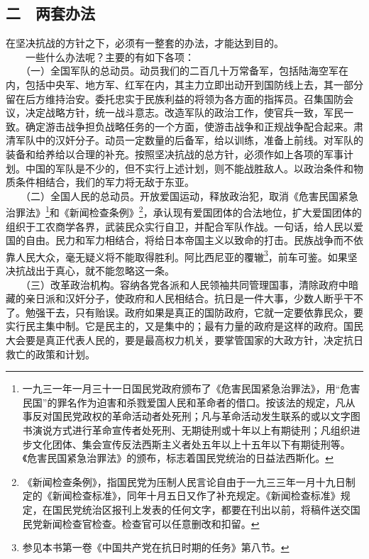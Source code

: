 \documentclass[cn,11pt,chinese]{elegantbook}
\def\myformat#1{\hfil\hfil #1}
\begin{document}
\subsection*{\myformat{二　两套办法}}
在坚决抗战的方针之下，必须有一整套的办法，才能达到目的。\\
　　一些什么办法呢？主要的有如下各项：\\
　　（一）全国军队的总动员。动员我们的二百几十万常备军，包括陆海空军在内，包括中央军、地方军、红军在内，其主力立即出动开到国防线上去，其一部分留在后方维持治安。委托忠实于民族利益的将领为各方面的指挥员。召集国防会议，决定战略方针，统一战斗意志。改造军队的政治工作，使官兵一致，军民一致。确定游击战争担负战略任务的一个方面，使游击战争和正规战争配合起来。肃清军队中的汉奸分子。动员一定数量的后备军，给以训练，准备上前线。对军队的装备和给养给以合理的补充。按照坚决抗战的总方针，必须作如上各项的军事计划。中国的军队是不少的，但不实行上述计划，则不能战胜敌人。以政治条件和物质条件相结合，我们的军力将无敌于东亚。\\
　　（二）全国人民的总动员。开放爱国运动，释放政治犯，取消《危害民国紧急治罪法》\footnote[3]{ 一九三一年一月三十一日国民党政府颁布了《危害民国紧急治罪法》，用“危害民国”的罪名作为迫害和杀戮爱国人民和革命者的借口。按该法的规定，凡从事反对国民党政权的革命活动者处死刑；凡与革命活动发生联系的或以文字图书演说方式进行革命宣传者处死刑、无期徒刑或十年以上有期徒刑；凡组织进步文化团体、集会宣传反法西斯主义者处五年以上十五年以下有期徒刑等。《危害民国紧急治罪法》的颁布，标志着国民党统治的日益法西斯化。}和《新闻检查条例》\footnote[4]{ 《新闻检查条例》，指国民党为压制人民言论自由于一九三三年一月十九日制定的《新闻检查标准》，同年十月五日又作了补充规定。《新闻检查标准》规定，在国民党统治区报刊上发表的任何文字，都要在刊出以前，将稿件送交国民党新闻检查官检查。检查官可以任意删改和扣留。}，承认现有爱国团体的合法地位，扩大爱国团体的组织于工农商学各界，武装民众实行自卫，并配合军队作战。一句话，给人民以爱国的自由。民力和军力相结合，将给日本帝国主义以致命的打击。民族战争而不依靠人民大众，毫无疑义将不能取得胜利。阿比西尼亚的覆辙\footnote[5]{ 参见本书第一卷《中国共产党在抗日时期的任务》第八节。}，前车可鉴。如果坚决抗战出于真心，就不能忽略这一条。\\
　　（三）改革政治机构。容纳各党各派和人民领袖共同管理国事，清除政府中暗藏的亲日派和汉奸分子，使政府和人民相结合。抗日是一件大事，少数人断乎干不了。勉强干去，只有贻误。政府如果是真正的国防政府，它就一定要依靠民众，要实行民主集中制。它是民主的，又是集中的；最有力量的政府是这样的政府。国民大会要是真正代表人民的，要是最高权力机关，要掌管国家的大政方针，决定抗日救亡的政策和计划。\\
\end{document}
